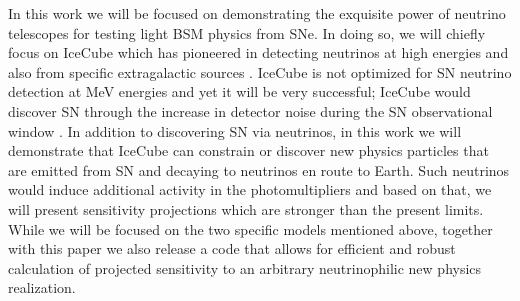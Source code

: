 In this work we will be focused on demonstrating the exquisite power of neutrino telescopes for testing light BSM physics from SNe. In doing so, we will chiefly focus on IceCube which has pioneered in detecting neutrinos at high energies \cite{IceCube:2014stg,IceCube:2018cha} and also from specific extragalactic sources \cite{IceCube:2023ame,IceCube:2022der}. IceCube is not optimized for SN neutrino detection at MeV energies and yet it will be very successful; IceCube would discover SN through the increase in detector noise during the SN observational window \cite{Kopke:2017req,SN2011}. In addition to discovering SN via neutrinos, in this work we will demonstrate that IceCube can constrain or discover new physics particles that are emitted from SN and decaying to neutrinos en route to Earth. Such neutrinos would induce additional activity in the photomultipliers and based on that, we will present sensitivity projections which are stronger than the present limits. While we will be focused on the two specific models mentioned above, together with this paper we also release 
a code that allows for efficient and robust calculation of projected sensitivity to an arbitrary neutrinophilic new physics realization.

